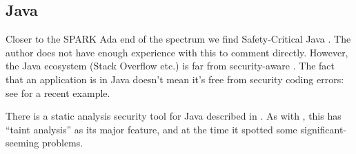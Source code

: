 \documentclass{eptcs}
\begin{document}
\subsection{Java}
Closer to the SPARK Ada end of the spectrum we find Safety-Critical Java \cite{Cavalcantietal2017a}.  The author does not have enough experience with this to comment directly. However, the Java ecosystem (Stack Overflow etc.) is far from security-aware \cite{Mengetal2018a}.                                                                                                                                                                                                                                                                                                                                                   The fact that an application is in Java doesn't mean it's free from security coding errors: see \cite{Google2018a} for a recent example.
\par
There is a static analysis security tool for Java described in \cite{LivshitsLam2005}.
As with \cite{ISO2013d}, this has ``taint analysis'' as its major feature, and at the time it spotted some significant-seeming problems.
\end{document}
